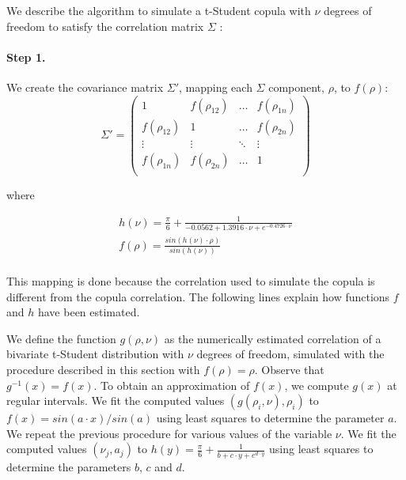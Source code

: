 \documentclass[a4paper,12pt,final]{article}
\begin{document}
We describe the algorithm to simulate a t-Student copula with $\nu$ degrees of freedom
to satisfy the correlation matrix $\Sigma$ \cite{copu:pricing}:

\paragraph{Step 1.} We create the covariance matrix $\Sigma'$, mapping 
each $\Sigma$ component, $\rho$, to $f(\rho)$:
\begin{displaymath}
\Sigma' = \left( 
\begin{array}{cccc}
1            & f(\rho_{12}) & \ldots & f(\rho_{1n})\\
f(\rho_{12}) & 1            & \ldots & f(\rho_{2n})\\
\vdots       & \vdots       & \ddots & \vdots      \\
f(\rho_{1n}) & f(\rho_{2n}) & \ldots & 1           \\
\end{array}
\right)
\end{displaymath}

where

\begin{displaymath}
\begin{array}{l}
h(\nu) = \frac{\pi}{6} + \frac{1}{-0.0562 + 1.3916 \cdot \nu + e^{-0.4726 \cdot \nu} } \\
f(\rho) = \frac{sin(h(\nu) \cdot \rho)}{sin(h(\nu))} \\
\end{array}
\end{displaymath}
\newline

This mapping is done because the correlation used to simulate the copula 
is different from the copula correlation. The following lines explain how functions 
$f$ and $h$ have been estimated.
\newline

We define the function $g(\rho, \nu)$ as the numerically estimated correlation of 
a bivariate t-Student distribution with $\nu$ degrees of freedom, simulated with the procedure 
described in this section with $f(\rho)=\rho$. Observe that $g^{-1}(x) = f(x)$.
To obtain an approximation of $f(x)$, we compute $g(x)$ at regular intervals. We fit 
the computed values $(g(\rho_i,\nu), \rho_i)$ to $f(x)=sin(a \cdot x)/sin(a)$ using 
least squares to determine the parameter $a$. We repeat the previous procedure for 
various values of the variable $\nu$. We fit the computed values $(\nu_j, a_j)$ to 
$h(y) = \frac{\pi}{6} + \frac{1}{b + c \cdot y + e^{d \cdot y} }$ using least squares
to determine the parameters $b$, $c$ and $d$.
\end{document}
